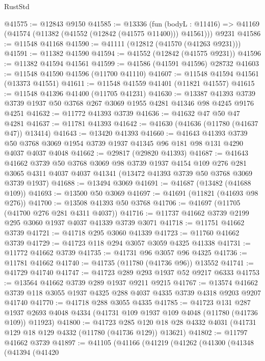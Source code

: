 \begin{lexlean}{RustStd}
\begin{coremodule}
@41575 := @12843 @9150
@41585 := @13336
    (fun (bodyL : @11416) => @41169 (@41574 (@11382 (@41552 (@12842 (@41575 @11400))) @41561)))
    @9231
@41586 := @11548 @41168
@41590 := @41111 (@12812 (@41570 (@41263 @9231)))
@41591 := @11382 @41590
@41594 := @41552 (@12842 (@41575 @9231))
@41596 := @11382 @41594 @41561
@41599 := @41586 (@41591 @41596) @28732
@41603 := @11548 @41590 @41596 (@11700 @41110)
@41607 := @11548 @41594 @41561 (@13373 @41551)
@41611 := @11548 @41559 @41401 (@11821 @41557)
@41615 := @11548 @41396 @41400 (@11705 @41231)
@41630 := @13387
    @41393
    @3739
    @3739
    @1937
    @50
    @3768
    @267
    @3069
    @1955
    @4281
    @41346
    @98
    @4245
    @9176
    @4251
@41632 := @11772 @41393 @3739
@41636 := @41632 @47 @50 @47 @4281
@41637 := @11781 @41393
@41642 := @41630 (@41636 (@11780 (@41637 @47)) @13414)
@41643 := @13420 @41393
@41660 := @41643
    @41393
    @3739
    @50
    @3768
    @3069
    @1954
    @3739
    @1937
    @41345
    @96
    @181
    @98
    @131
    @4290
    @4037
    @4037
    @4048
@41662 := @29817 (@29820 @41393)
@41687 := @41643
    @41662
    @3739
    @50
    @3768
    @3069
    @98
    @3739
    @1937
    @4154
    @109
    @276
    @281
    @3065
    @4311
    @4037
    @4037
    @41341
    (@13472 @41393 @3739 @50 @3768 @3069 @3739 @1937)
@41688 := @13494 @3069
@41691 := @41687 (@13482 (@41688 @109))
@41693 := @13500 @50 @3069
@41697 := @41691 (@11821 (@41693 @98 @276))
@41700 := @13508 @41393 @50 @3768
@41706 := @41697 (@11705 (@41700 @276 @281 @4311 @4037))
@41716 := @11737 @41662 @3739 @2199 @295 @3060 @1937 @4037 @41339 @3739 @3071
@41718 := @11751 @41662 @3739
@41721 := @41718 @295 @3060 @41339
@41723 := @11760 @41662 @3739
@41729 := @41723 @118 @294 @3057 @3059 @4325 @41338
@41731 := @11772 @41662 @3739
@41735 := @41731 @96 @3057 @96 @4325
@41736 := @11781 @41662
@41740 := @41735 (@11780 (@41736 @96)) @13552
@41741 := @41729 @41740
@41747 := @41723 @289 @293 @1937 @52 @9217 @6333
@41753 := @13564 @41662 @3739 @289 @1937 @9211 @9215
@41767 := @13574 @41662 @3739 @118 @3055 @1937 @4325 @288 @4037 @4335 @3739 @4318 @9203 @9207 @41740
@41770 := @41718 @288 @3055 @4335
@41785 := @41723
    @131
    @287
    @1937
    @2693
    @4048
    @4334
    (@41731 @109 @1937 @109 @4048 (@11780 (@41736 @109)) @11923)
@41800 := @41723
    @285
    @120
    @18
    @28
    @4332
    @4031
    (@41731 @129 @18 @129 @4332 (@11780 (@41736 @129)) @13621)
@41802 := @11797 @41662 @3739
@41897 := @41105
    (@41166
      (@41219
        (@41262
          (@41300
            (@41348
              (@41394
                (@41420

\end{coremodule}
\end{lexlean}
